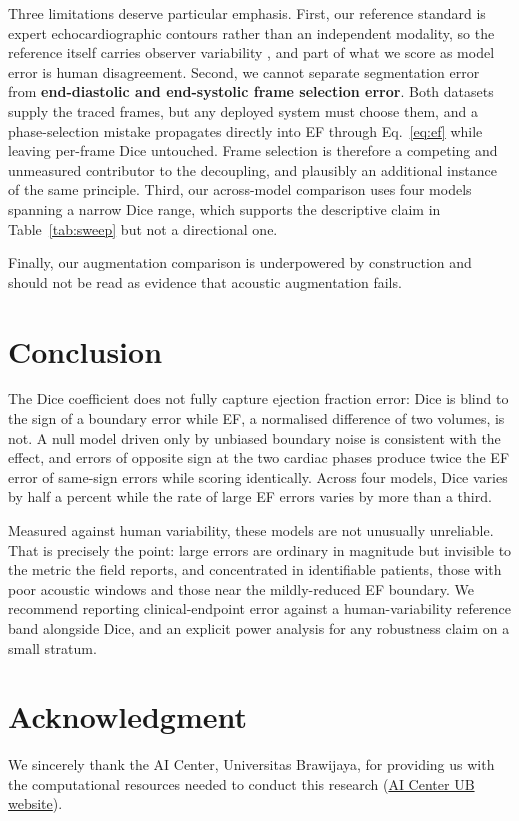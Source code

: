 \documentclass[conference,a4paper]{IEEEtran}
\begin{document}
Three limitations deserve particular emphasis. First, our reference standard is expert
echocardiographic contours rather than an independent modality, so the reference itself
carries observer variability \cite{thavendiranathan2013,thavendiranathan2013b}, and part of
what we score as model error is human disagreement. Second, we cannot separate segmentation
error from \textbf{end-diastolic and end-systolic frame selection error}. Both datasets
supply the traced frames, but any deployed system must choose them, and a phase-selection
mistake propagates directly into EF through Eq.~\eqref{eq:ef} while leaving per-frame Dice
untouched. Frame selection is therefore a competing and unmeasured contributor to the
decoupling, and plausibly an additional instance of the same principle. Third, our
across-model comparison uses four models spanning a narrow Dice range, which supports the
descriptive claim in Table~\ref{tab:sweep} but not a directional one.

Finally, our augmentation comparison is underpowered by construction and should not be read
as evidence that acoustic augmentation fails.

\section{Conclusion}

The Dice coefficient does not fully capture ejection fraction error: Dice is blind to the
sign of a boundary error while EF, a
normalised difference of two volumes, is not. A null model driven only by unbiased boundary
noise is consistent with the effect, and errors of opposite sign at the two cardiac phases produce
twice the EF error of same-sign errors while scoring identically. Across four models, Dice
varies by half a percent while the rate of large EF errors varies by more than a third.

Measured against human variability, these models are not unusually unreliable. That is
precisely the point: large errors are ordinary in magnitude but invisible to the metric the
field reports, and concentrated in identifiable patients, those with poor acoustic windows
and those near the mildly-reduced EF boundary. We recommend reporting clinical-endpoint
error against a human-variability reference band alongside Dice, and an explicit power
analysis for any robustness claim on a small stratum.

\section*{Acknowledgment}
We sincerely thank the AI Center, Universitas Brawijaya, for providing us with the
computational resources needed to conduct this research
(\href{https://aicenter.ub.ac.id/}{AI Center UB website}).
\end{document}
